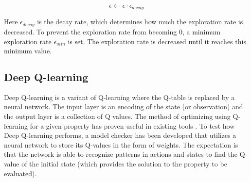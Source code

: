\begin{equation}
    \epsilon \leftarrow \epsilon \cdot \epsilon_{decay}
\end{equation}

Here $\epsilon_{decay}$ is the decay rate, which determines how much the exploration rate is decreased. To prevent the exploration rate from becoming $0$, a minimum exploration rate $\epsilon_{min}$ is set. The exploration rate is decreased until it reaches this minimum value.

\subsection{Deep Q-learning}

Deep Q-learning is a variant of Q-learning where the Q-table is replaced by a neural network. The input layer is an encoding of the state (or observation) and the output layer is a collection of Q values. The method of optimizing using Q-learning for a given property has proven useful in existing tools \cite{modest}. To test how Deep Q-learning performs, a model checker has been developed that utilizes a neural network to store its Q-values in the form of weights. The expectation is that the network is able to recognize patterns in actions and states to find the Q-value of the initial state (which provides the solution to the property to be evaluated).
